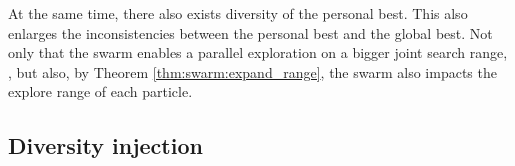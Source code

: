At the same time, there also exists diversity of the personal best.
This also enlarges the inconsistencies between the personal best and the global best.
Not only that the swarm enables a parallel exploration on a bigger joint search range,
, but also, by Theorem \ref{thm:swarm:expand_range}, the swarm also impacts the explore range of each particle.

\subsection{Diversity injection}

